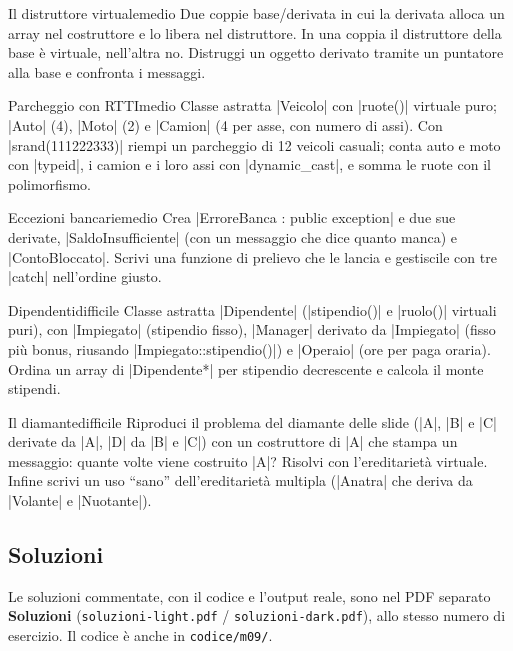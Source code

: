 \begin{esercizio}{Il distruttore virtuale}{medio}
Due coppie base/derivata in cui la derivata alloca un array nel costruttore e lo libera
nel distruttore. In una coppia il distruttore della base è virtuale, nell'altra no.
Distruggi un oggetto derivato tramite un puntatore alla base e confronta i messaggi.
\end{esercizio}

\begin{esercizio}{Parcheggio con RTTI}{medio}
Classe astratta \cc|Veicolo| con \cc|ruote()| virtuale puro; \cc|Auto| (4), \cc|Moto|
(2) e \cc|Camion| (4 per asse, con numero di assi). Con \cc|srand(111222333)| riempi un
parcheggio di 12 veicoli casuali; conta auto e moto con \cc|typeid|, i camion e i loro
assi con \cc|dynamic_cast|, e somma le ruote con il polimorfismo.
\end{esercizio}

\begin{esercizio}{Eccezioni bancarie}{medio}
Crea \cc|ErroreBanca : public exception| e due sue derivate,
\cc|SaldoInsufficiente| (con un messaggio che dice quanto manca) e \cc|ContoBloccato|.
Scrivi una funzione di prelievo che le lancia e gestiscile con tre \cc|catch| nell'ordine
giusto.
\end{esercizio}

\begin{esercizio}{Dipendenti}{difficile}
Classe astratta \cc|Dipendente| (\cc|stipendio()| e \cc|ruolo()| virtuali puri), con
\cc|Impiegato| (stipendio fisso), \cc|Manager| derivato da \cc|Impiegato| (fisso più
bonus, riusando \cc|Impiegato::stipendio()|) e \cc|Operaio| (ore per paga oraria).
Ordina un array di \cc|Dipendente*| per stipendio decrescente e calcola il monte stipendi.
\end{esercizio}

\begin{esercizio}{Il diamante}{difficile}
Riproduci il problema del diamante delle slide (\cc|A|, \cc|B| e \cc|C| derivate da
\cc|A|, \cc|D| da \cc|B| e \cc|C|) con un costruttore di \cc|A| che stampa un messaggio:
quante volte viene costruito \cc|A|? Risolvi con l'ereditarietà virtuale. Infine scrivi
un uso ``sano'' dell'ereditarietà multipla (\cc|Anatra| che deriva da \cc|Volante| e
\cc|Nuotante|).
\end{esercizio}

\subsection*{Soluzioni}
Le soluzioni commentate, con il codice e l'output reale, sono nel PDF separato
\textbf{Soluzioni} (\texttt{soluzioni-light.pdf} / \texttt{soluzioni-dark.pdf}),
allo stesso numero di esercizio. Il codice è anche in \texttt{codice/m09/}.
